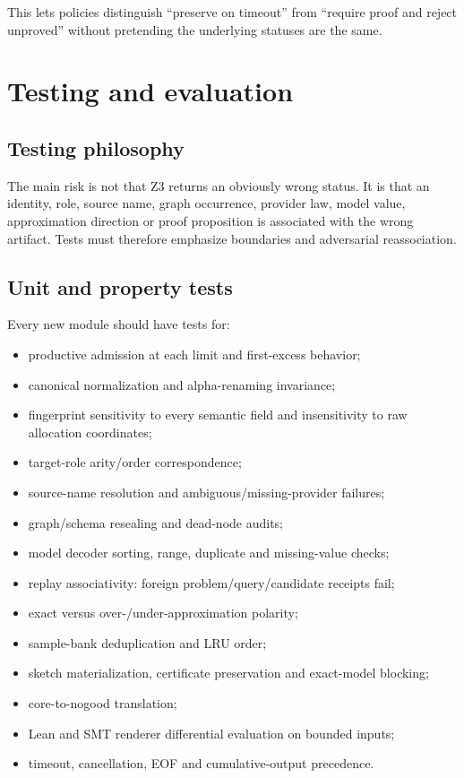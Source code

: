 \documentclass[11pt,oneside]{report}
\begin{document}
This lets policies distinguish ``preserve on timeout'' from ``require proof and reject unproved'' without pretending the underlying statuses are the same.

\chapter{Testing and evaluation}
\label{chap:testing}

\section{Testing philosophy}

The main risk is not that Z3 returns an obviously wrong status. It is that an identity, role, source name, graph occurrence, provider law, model value, approximation direction or proof proposition is associated with the wrong artifact. Tests must therefore emphasize boundaries and adversarial reassociation.

\section{Unit and property tests}

Every new module should have tests for:

\begin{itemize}[leftmargin=2em]
\item productive admission at each limit and first-excess behavior;
\item canonical normalization and alpha-renaming invariance;
\item fingerprint sensitivity to every semantic field and insensitivity to raw allocation coordinates;
\item target-role arity/order correspondence;
\item source-name resolution and ambiguous/missing-provider failures;
\item graph/schema resealing and dead-node audits;
\item model decoder sorting, range, duplicate and missing-value checks;
\item replay associativity: foreign problem/query/candidate receipts fail;
\item exact versus over-/under-approximation polarity;
\item sample-bank deduplication and LRU order;
\item sketch materialization, certificate preservation and exact-model blocking;
\item core-to-nogood translation;
\item Lean and SMT renderer differential evaluation on bounded inputs;
\item timeout, cancellation, EOF and cumulative-output precedence.
\end{itemize}
\end{document}
